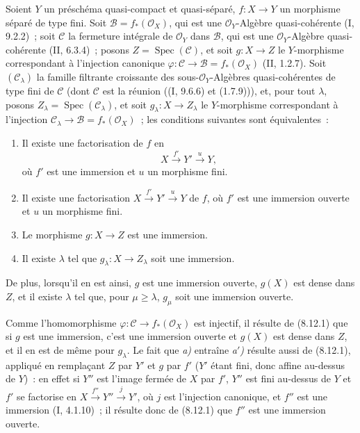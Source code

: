 \begin{proposition}[8.12.3]
\label{IV.8.12.3-fr}
Soient $Y$ un préschéma quasi-compact et quasi-séparé, $f:X\to Y$ un
morphisme séparé de type fini. Soit $\mathcal B=f_*(\mathcal O_X)$, qui est
une $\mathcal O_Y$-Algèbre quasi-cohérente (I, 9.2.2)~; soit $\mathcal C$ la
fermeture intégrale de $\mathcal O_Y$ dans $\mathcal B$, qui est une
$\mathcal O_Y$-Algèbre quasi-cohérente (II, 6.3.4)~; posons
$Z=\operatorname{Spec}(\mathcal C)$, et soit $g:X\to Z$ le $Y$-morphisme
correspondant à l'injection canonique
$\varphi:\mathcal C\to\mathcal B=f_*(\mathcal O_X)$ (II, 1.2.7). Soit
$(\mathcal C_\lambda)$ la famille filtrante croissante des
sous-$\mathcal O_Y$-Algèbres quasi-cohérentes de type fini de $\mathcal C$
(dont $\mathcal C$ est la réunion ((I, 9.6.6) et (1.7.9))), et, pour tout
$\lambda$, posons $Z_\lambda=\operatorname{Spec}(\mathcal C_\lambda)$, et
soit $g_\lambda:X\to Z_\lambda$ le $Y$-morphisme correspondant à l'injection
$\mathcal C_\lambda\to\mathcal B=f_*(\mathcal O_X)$~; les conditions
suivantes sont équivalentes~:
\begin{enumerate}
\item[\emph{a)}] Il existe une factorisation de $f$ en
\[
X\xrightarrow{f'}Y'\xrightarrow{u}Y,
\]
où $f'$ est une immersion et $u$ un morphisme fini.
\item[\emph{a$'$)}] Il existe une factorisation
$X\xrightarrow{f'}Y'\xrightarrow{u}Y$ de $f$, où $f'$ est une immersion
ouverte et $u$ un morphisme fini.
\item[\emph{b)}] Le morphisme $g:X\to Z$ est une immersion.
\item[\emph{c)}] Il existe $\lambda$ tel que
$g_\lambda:X\to Z_\lambda$ soit une immersion.
\end{enumerate}
De plus, lorsqu'il en est ainsi, $g$ est une immersion ouverte, $g(X)$ est
dense dans $Z$, et il existe $\lambda$ tel que, pour $\mu\geq\lambda$,
$g_\mu$ soit une immersion ouverte.
\end{proposition}

Comme l'homomorphisme $\varphi:\mathcal C\to f_*(\mathcal O_X)$ est
injectif, il résulte de (8.12.1) que si $g$ est une immersion, c'est une
immersion ouverte et $g(X)$ est dense dans $Z$, et il en est de même pour
$g_\lambda$. Le fait que \emph{a)} entraîne \emph{a$'$)} résulte aussi de
(8.12.1), appliqué en remplaçant $Z$ par $Y'$ et $g$ par $f'$ ($Y'$ étant
fini, donc affine au-dessus de $Y$)~: en effet si $Y''$ est l'image fermée de
$X$ par $f'$, $Y''$ est fini au-dessus de $Y$ et $f'$ se factorise en
$X\xrightarrow{f''}Y''\xrightarrow{j}Y'$, où $j$ est l'injection canonique,
et $f''$ est une immersion (I, 4.1.10)~; il résulte donc de (8.12.1) que
$f''$ est une immersion ouverte.

